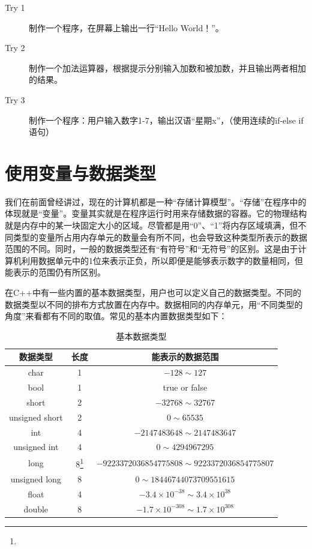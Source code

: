 \begin{description}
	\item[Try 1]制作一个程序，在屏幕上输出一行“Hello World！”。
	\item[Try 2]制作一个加法运算器，根据提示分别输入加数和被加数，并且输出两者相加的结果。
	\item[Try 3]制作一个程序：用户输入数字1-7，输出汉语“星期x”，（使用连续的if-else if语句）
\end{description}

\section{使用变量与数据类型}
我们在前面曾经讲过，现在的计算机都是一种“存储计算模型”。“存储”在程序中的体现就是“变量”。变量其实就是在程序运行时用来存储数据的容器。它的物理结构就是内存中的某一块固定大小的区域。尽管都是用“0”、“1”将内存区域填满，但不同类型的变量所占用内存单元的数量会有所不同，也会导致这种类型所表示的数据范围的不同。同时，一般的数据类型还有“有符号”和“无符号”的区别。这是由于计算机利用数据单元中的1位来表示正负，所以即便是能够表示数字的数量相同，但能表示的范围仍有所区别。

在C++中有一些内置的基本数据类型，用户也可以定义自己的数据类型。不同的数据类型以不同的排布方式放置在内存中。数据相同的内存单元，用“不同类型的角度”来看都有不同的取值。常见的基本内置数据类型如下：


\begin{table}
	\begin{center}
		\caption{基本数据类型}
		\label{tab:DataTypes}
		\begin{tabular}{|c|c|c|}
			\hline
				数据类型 & 长度 & 能表示的数据范围\\
			\hline
				char & 1 & $-128 \sim 127$				\\
				bool & 1 & true or false				\\
				short & 2 & $-32768 \sim 32767$			\\
				unsigned short & 2	 & $0 \sim 65535$\\
				int & 4 & $-2147483648 \sim 2147483647$	\\
				unsigned int & 4 & $0 \sim 4294967295$ \\
				long & 8\footnote{} & $-9223372036854775808 \sim 9223372036854775807$	\\
				unsigned long & 8 & $0 \sim 18446744073709551615$ \\
				float & 4 & $-3.4\times10^{-38} \sim 3.4\times10^{38} $ \\
				double & 8 & $-1.7\times10^{-308} \sim 1.7\times10^{308} $\\
			\hline
		\end{tabular}
	\end{center}
\end{table}

